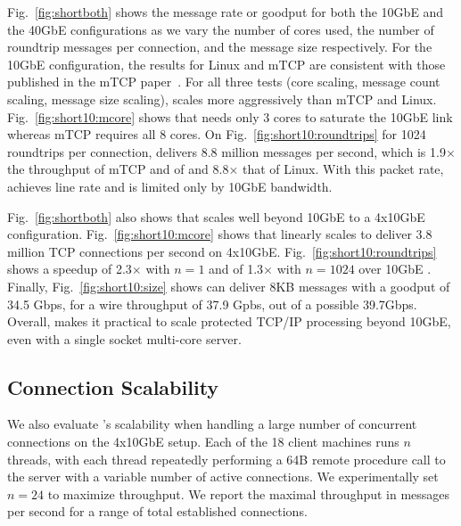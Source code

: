 
Fig.~\ref{fig:shortboth} shows the message
rate or goodput for both the 10GbE and the 40GbE configurations as we
vary the number of cores used, the number of roundtrip messages per
connection, and the message size respectively.  For the 10GbE
configuration, the results for Linux and mTCP are consistent with
those published in the mTCP paper~\cite{jeong2014mtcp}.  For all three
tests (core scaling, message count scaling, message size scaling), \ix
scales more aggressively than mTCP and
Linux. Fig.~\ref{fig:short10:mcore} shows that \ix needs only 3 cores
to saturate the 10GbE link whereas mTCP requires all 8 cores. On
Fig.~\ref{fig:short10:roundtrips} for 1024 roundtrips per connection,
\ix delivers 8.8 million messages per second, which is
1.9$\times$ the throughput of mTCP and of and 8.8$\times$ that of
Linux. With this packet rate, \ix achieves line rate and is limited
only by 10GbE bandwidth.


Fig.~\ref{fig:shortboth} also shows that \ix
scales well beyond 10GbE to a 4x10GbE configuration.
Fig.~\ref{fig:short10:mcore} shows that \ix linearly scales to deliver
3.8 million TCP connections per second on 4x10GbE.
Fig.~\ref{fig:short10:roundtrips} shows a speedup of 2.3$\times$ with $n=1$
and of 1.3$\times$ with $n=1024$ over 10GbE \ix.  Finally,
Fig.~\ref{fig:short10:size} shows \ix can deliver 8KB messages with a
goodput of 34.5 Gbps, for a wire throughput of
37.9 Gpbs, out of a possible 39.7Gbps.  Overall, \ix makes
it practical to scale protected TCP/IP processing beyond 10GbE, even
with a single socket multi-core server.



\subsection{Connection Scalability}

\label{sec:eval:scale}

We also evaluate \ix's scalability when handling a large number of
concurrent connections on the 4x10GbE setup. Each of the 18 client
machines runs $n$ threads, with each thread repeatedly performing a
64B remote procedure call to the server with a variable number of
active connections. %
We experimentally set $n=24$ to maximize
throughput.  We report the maximal throughput in messages per second
for a range of total established connections.


